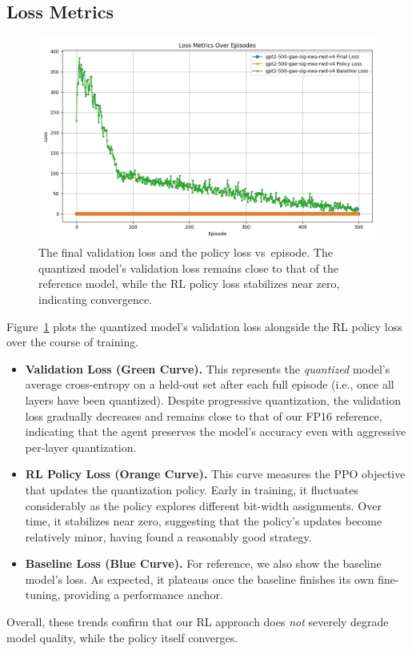 \documentclass{article}
\begin{document}
	\subsection{Loss Metrics}
	\begin{figure}[ht]
		\centering
		\includegraphics[width=\columnwidth]{gpt2-500-gae-sig-ewa-rwd-v4-losses.png}
		\vspace{-1em}
		\caption{\small The final validation loss and the policy loss vs\ episode. The quantized model’s validation loss remains close to that of the reference model, while the RL policy loss stabilizes near zero, indicating convergence.}
		\label{fig:loss_curves}
		\vspace{-0.2em}
	\end{figure}
	Figure~\ref{fig:loss_curves} plots the quantized model’s validation loss alongside the RL policy loss over the course of training. 
	\begin{itemize}
		\item \textbf{Validation Loss (Green Curve).} This represents the \emph{quantized} model’s average cross-entropy on a held-out set after each full episode (i.e., once all layers have been quantized). Despite progressive quantization, the validation loss gradually decreases and remains close to that of our FP16 reference, indicating that the agent preserves the model’s accuracy even with aggressive per-layer quantization.
		\item \textbf{RL Policy Loss (Orange Curve).} This curve measures the PPO objective that updates the quantization policy. Early in training, it fluctuates considerably as the policy explores different bit-width assignments. Over time, it stabilizes near zero, suggesting that the policy’s updates become relatively minor, having found a reasonably good strategy.
		\item \textbf{Baseline Loss (Blue Curve).} For reference, we also show the baseline model’s loss. As expected, it plateaus once the baseline finishes its own fine-tuning, providing a performance anchor.
	\end{itemize}
	Overall, these trends confirm that our RL approach does \emph{not} severely degrade model quality, while the policy itself converges.
	
\end{document}
